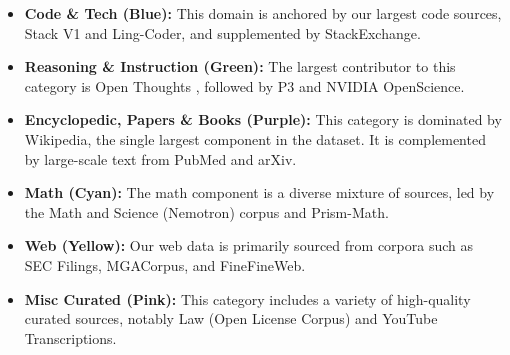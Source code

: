 \begin{itemize}
    \item \textbf{Code \& Tech (Blue):} This domain is anchored by our largest code sources, Stack V1 and Ling-Coder, and supplemented by StackExchange.
    
    \item \textbf{Reasoning \& Instruction (Green):} The largest contributor to this category is Open Thoughts , followed by P3 and NVIDIA OpenScience.
    
    \item \textbf{Encyclopedic, Papers \& Books (Purple):} This category is dominated by Wikipedia, the single largest component in the dataset. It is complemented by large-scale text from PubMed  and arXiv.
    
    \item \textbf{Math (Cyan):} The math component is a diverse mixture of sources, led by the Math and Science (Nemotron) corpus and Prism-Math.
    
    \item \textbf{Web (Yellow):} Our web data is primarily sourced from corpora such as SEC Filings, MGACorpus, and FineFineWeb.
    
    \item \textbf{Misc Curated (Pink):} This category includes a variety of high-quality curated sources, notably Law (Open License Corpus) and YouTube Transcriptions.
\end{itemize}


% 